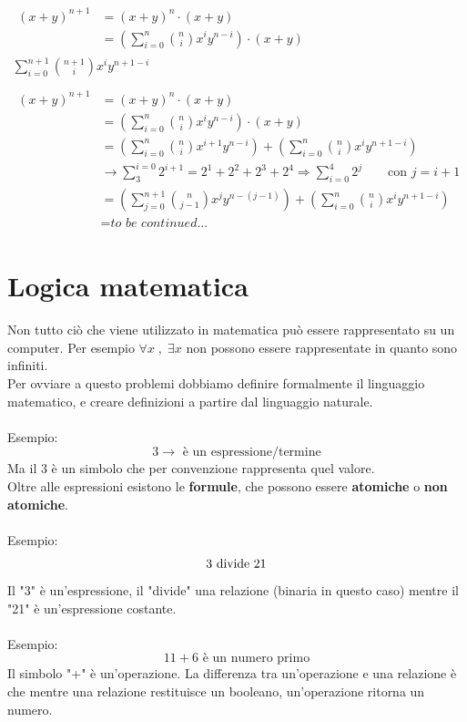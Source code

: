 \documentclass[italian]{article}
\begin{document}
\begin{gather*}
	\begin{split}
		(x+y)^{n+1} &= (x+y)^n\cdot (x+y) \\
		&= \left(\sum_{i=0}^{n}\binom{n}{i}x^iy^{n-i} \right)\cdot(x+y)
	\end{split}\\
	\sum_{i=0}^{n+1}\binom{n+1}{i}x^iy^{n+1-i}\\\\
	\begin{split}
		(x+y)^{n+1} &= (x+y)^n\cdot(x+y)\\
		&= \left( \sum_{i=0}^{n}\binom{n}{i}x^iy^{n-i} \right)\cdot(x+y) \\
		&= \left( \sum_{i=0}^{n}\binom{n}{i}x^{i+1}y^{n-i}\right) + \left( \sum_{i=0}^{n}\binom{n}{i}x^iy^{n+1-i} \right)\\
		&\to \sum_{3}^{i=0}2^{i+1} = 2^1 + 2^2 + 2^3 + 2^4 \Rightarrow \sum_{i=0}^{4}2^j \qquad \text{con } j=i+1	\\
		&= \left( \sum_{j=0}^{n+1}\binom{n}{j-1}x^jy^{n-(j-1)}\right) + \left( 
		\sum_{i=0}^{n}\binom{n}{i}x^iy^{n+1-i} \right)\\
		&= \textit{to be continued...}
	\end{split}
\end{gather*}

\pagebreak
\section{Logica matematica}
Non tutto ciò che viene utilizzato in matematica può essere rappresentato su un computer. Per esempio $\forall x \;,\;  \exists x$ non possono essere rappresentate in quanto sono infiniti.\\
Per ovviare a questo problemi dobbiamo definire formalmente il linguaggio matematico, e creare definizioni a partire dal linguaggio naturale.\\\\
Esempio:
\[
	3 \to \text{ è un espressione/termine}
\]
Ma il $3$ è un simbolo che per convenzione rappresenta quel valore.\\
Oltre alle espressioni esistono le \textbf{formule}, che possono essere \textbf{atomiche} o \textbf{non atomiche}.\\\\
Esempio:
\[
	3 \text{ divide } 21 \\
\]
Il "3" è un'espressione, il "divide" una relazione (binaria in questo caso) mentre il "21" è un'espressione costante.\\\\
Esempio:
\[
	11 + 6 \text{ è un numero primo}
\]
Il simbolo "+" è un'operazione. La differenza tra un'operazione e una relazione è che mentre una relazione restituisce un booleano, un'operazione ritorna un numero.\\\\
\end{document}
